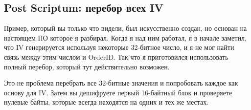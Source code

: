 \subsection{Post Scriptum: перебор всех \ac{IV}}

Пример, который вы только что видели, был искусственно создан, но основан на настоящем ПО которое я разбирал.
Когда я над ним работал, я в начале заметил, что \ac{IV} генерируется используя некоторые 32-битное число,
и я не мог найти связь между этим числом и OrderID.
Так что я приготовился использовать полный перебор, который тут действительно возможен.

Это не проблема перебрать все 32-битные значения и попробовать каждое как основу для \ac{IV}.
Затем вы дешифруете первый 16-байтный блок и проверяете нулевые байты, которые всегда находятся на одних и тех же местах.
